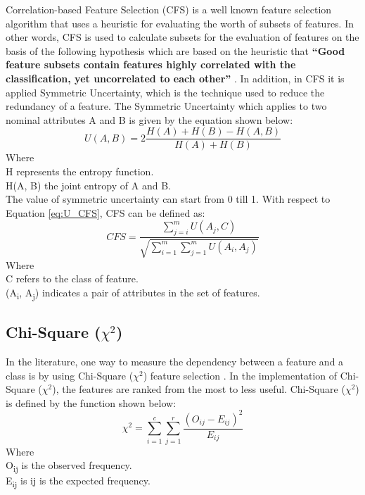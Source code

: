 \documentclass[review]{elsarticle}
\begin{document}
Correlation-based Feature Selection (CFS) is a well known feature selection algorithm that uses a heuristic for evaluating the worth of subsets of features. In other words, CFS is used to calculate subsets for the evaluation of features on the basis of the following hypothesis which are based on the heuristic that \textbf{\enquote{Good feature subsets contain features highly correlated with the classification, yet uncorrelated to each other}}  \cite{Hall1999} \cite{Lewandowski2015}. In addition, in CFS it is applied Symmetric Uncertainty, which is the technique used to reduce the redundancy of a feature. The Symmetric Uncertainty which applies to two nominal attributes A and B is given by the equation shown below:
\begin{equation}
U(A,B) =2 \dfrac{H(A)+H(B)-H(A,B)}{H(A) + H(B)}
\label{eq:U_CFS}
\end{equation}
Where \\
H represents the entropy function.\\
H(A, B) the joint entropy of A and B. \\
The value of symmetric uncertainty can start from 0 till 1. 
With respect to Equation \ref{eq:U_CFS}, CFS can be defined as: 
\begin{equation}
	CFS= \dfrac{\sum_{j=i}^m U(A_j,C)}{\sqrt{\sum_{i=1}^m \sum_{j=1}^m U(A_i,A_j)}}
	\label{eq:CFS}
\end{equation}
Where \\
C refers to the class of feature. \\
(A\textsubscript{i}, A\textsubscript{j}) indicates a pair of attributes in the set of features.


\subsection{Chi-Square ($\chi^2$)}
\label{subsec:chi_sq}
In the literature, one way to measure the dependency between a feature and a class is by using Chi-Square ($\chi^2$) feature selection \cite{Plackett1983}. In the implementation of Chi-Square ($\chi^2$), the features are ranked from the most to less useful. Chi-Square ($\chi^2$) is defined by the function shown below:
\begin{equation}
\chi^2 = \sum_{i=1}^{c} \sum_{j=1}^{r} \dfrac{(O_{ij} - E_{ij})^2}{E_{ij}}
\label{eq:chi-sq}
\end{equation}
Where\\
O\textsubscript{ij} is the observed frequency.\\ 
E\textsubscript{ij} is ij is the expected frequency. 
\end{document}
